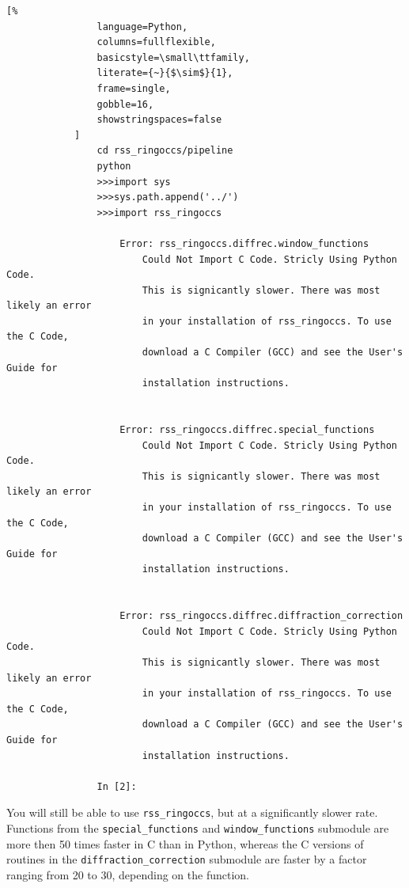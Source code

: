 \documentclass[titlepage, 12pt]{article}
\begin{document}
            \begin{lstlisting}[%
                language=Python,
                columns=fullflexible,
                basicstyle=\small\ttfamily,
                literate={~}{$\sim$}{1},
                frame=single,
                gobble=16,
                showstringspaces=false
            ]
                cd rss_ringoccs/pipeline
                python
                >>>import sys
                >>>sys.path.append('../')
                >>>import rss_ringoccs
                
                    Error: rss_ringoccs.diffrec.window_functions
                        Could Not Import C Code. Stricly Using Python Code.
                        This is signicantly slower. There was most likely an error
                        in your installation of rss_ringoccs. To use the C Code,
                        download a C Compiler (GCC) and see the User's Guide for
                        installation instructions.
                        
                
                    Error: rss_ringoccs.diffrec.special_functions
                        Could Not Import C Code. Stricly Using Python Code.
                        This is signicantly slower. There was most likely an error
                        in your installation of rss_ringoccs. To use the C Code,
                        download a C Compiler (GCC) and see the User's Guide for
                        installation instructions.
                
                
                    Error: rss_ringoccs.diffrec.diffraction_correction
                        Could Not Import C Code. Stricly Using Python Code.
                        This is signicantly slower. There was most likely an error
                        in your installation of rss_ringoccs. To use the C Code,
                        download a C Compiler (GCC) and see the User's Guide for
                        installation instructions.
                
                In [2]: 
            \end{lstlisting}
            You will still be able to use
            \texttt{rss\_ringoccs}, but at a significantly
            slower rate. Functions from the
            \texttt{special\_functions} and
            \texttt{window\_functions} submodule are more then 50 times faster in C than in Python,
            whereas the C versions of routines in the
            \texttt{diffraction\_correction} submodule
            are faster by a factor ranging from 20
            to 30, depending on the function.
\end{document}
